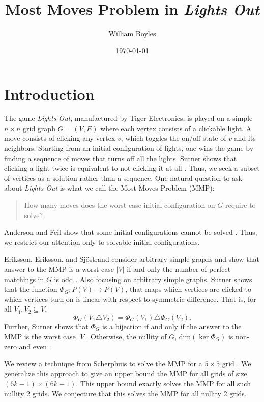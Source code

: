 \documentclass[a4paper]{article}
\newcommand{\abs}[1]{\left| #1 \right|}
\renewcommand{\dim}[1]{\text{dim}\left( #1 \right)}
\begin{document}
	\title{Most Moves Problem in \textit{Lights Out}}
	\author{William Boyles}
	\date{\today}
	\maketitle
	
	\section{Introduction}
	The game \textit{Lights Out}, manufactured by Tiger Electronics, is played on a simple $n \times n$ grid graph $G=(V,E)$ where each vertex consists of a clickable light.
	A move consists of clicking any vertex $v$, which toggles the on/off state of $v$ and its neighbors.
	Starting from an initial configuration of lights, one wins the game by finding a sequence of moves that turns off all the lights.
	Sutner shows that clicking a light twice is equivalent to not clicking it at all \cite{Sutner1989}.
	Thus, we seek a subset of vertices as a solution rather than a sequence.
	One natural question to ask about \textit{Lights Out} is what we call the Most Moves Problem (MMP):
	\begin{quote}
		How many moves does the worst case initial configuration on $G$ require to solve?
	\end{quote}
	Anderson and Feil show that some initial configurations cannot be solved \cite{anderson_feil}.
	Thus, we restrict our attention only to solvable initial configurations.
		
	Eriksson, Eriksson, and Sjöstrand consider arbitrary simple graphs and show that answer to the MMP is a worst-case $\abs{V}$ if and only the number of perfect matchings in $G$ is odd \cite{ERIKSSON2001357}.
	Also focusing on arbitrary simple graphs, Sutner shows that the function $\Phi_G: P(V) \to P(V)$, that maps which vertices are clicked to which vertices turn on is linear with respect to symmetric difference.
	That is, for all $V_1, V_2 \subseteq V$,
	\begin{equation*}
		\Phi_G(V_1 \triangle V_2) = \Phi_G(V_1) \triangle \Phi_G(V_2).
	\end{equation*}
	Further, Sutner shows that $\Phi_G$ is a bijection if and only if the answer to the MMP is the worst case $\abs{V}$.
	Otherwise, the nullity of $G$, $\dim{\ker{\Phi_G}}$ is non-zero and even \cite{Sutner1989}.
	
	We review a technique from Scherphuis to solve the MMP for a $5 \times 5$ grid \cite{jaap}.
	We generalize this approach to give an upper bound the MMP for all grids of size $(6k-1) \times (6k-1)$.
	This upper bound exactly solves the MMP for all such nullity 2 grids.
	We conjecture that this solves the MMP for all nullity 2 grids.
	
\end{document}
